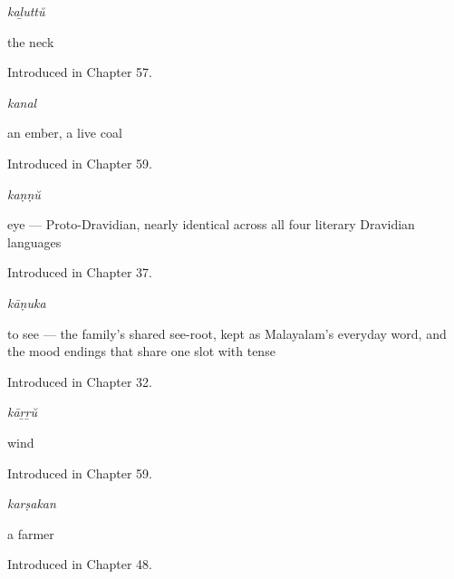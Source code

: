 \noindent\begin{minipage}[t]{\linewidth}
\raggedright
\textbf{}\enspace\emph{kaḻuttŭ}\par
\small the neck\par
\footnotesize Introduced in Chapter 57.
\end{minipage}\par\medskip

\noindent\begin{minipage}[t]{\linewidth}
\raggedright
\textbf{}\enspace\emph{kanal}\par
\small an ember, a live coal\par
\footnotesize Introduced in Chapter 59.
\end{minipage}\par\medskip

\noindent\begin{minipage}[t]{\linewidth}
\raggedright
\textbf{}\enspace\emph{kaṇṇŭ}\par
\small eye — Proto-Dravidian, nearly identical across all four literary Dravidian languages\par
\footnotesize Introduced in Chapter 37.
\end{minipage}\par\medskip

\noindent\begin{minipage}[t]{\linewidth}
\raggedright
\textbf{}\enspace\emph{kāṇuka}\par
\small to see — the family's shared see-root, kept as Malayalam's everyday word, and the mood endings that share one slot with tense\par
\footnotesize Introduced in Chapter 32.
\end{minipage}\par\medskip

\noindent\begin{minipage}[t]{\linewidth}
\raggedright
\textbf{}\enspace\emph{kāṟṟŭ}\par
\small wind\par
\footnotesize Introduced in Chapter 59.
\end{minipage}\par\medskip

\noindent\begin{minipage}[t]{\linewidth}
\raggedright
\textbf{}\enspace\emph{karṣakan}\par
\small a farmer\par
\footnotesize Introduced in Chapter 48.
\end{minipage}\par\medskip

